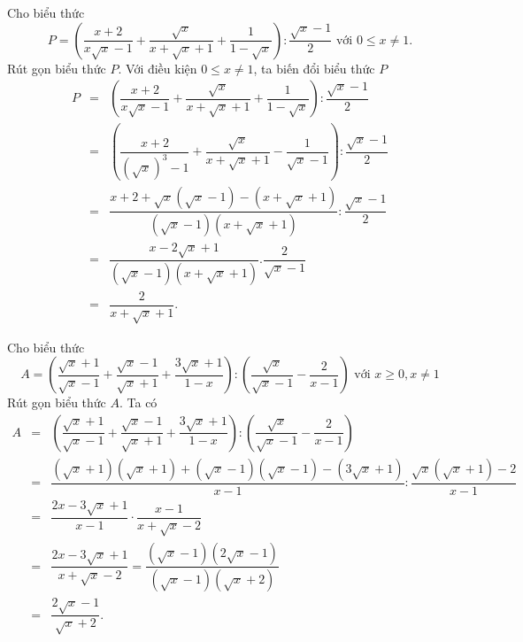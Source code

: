 \begin{bt}%
	Cho biểu thức $$P=\left({\dfrac{x+2}{x\sqrt{x}-1}+\dfrac{\sqrt{x}}{x+\sqrt{x}+1}+\dfrac{1}{1-\sqrt{x}}}\right):\dfrac{\sqrt{x}-1}{2} \text{ với } 0\leq x\ne 1.$$ Rút gọn biểu thức $P$.
	\loigiai
	{
		Với điều kiện $0\leq x\ne 1$, ta biến đổi biểu thức $P$
		\allowdisplaybreaks
		\begin{eqnarray*}
			P &=& \left({\dfrac{x+2}{x\sqrt{x}-1}+\dfrac{\sqrt{x}}{x+\sqrt{x}+1}+\dfrac{1}{1-\sqrt{x}}}\right):\dfrac{\sqrt{x}-1}{2}\\
			&=& \left({\dfrac{x+2}{\left(\sqrt{x}\right)^3-1}+\dfrac{\sqrt{x}}{x+\sqrt{x}+1}-\dfrac{1}{\sqrt{x}-1}}\right):\dfrac{\sqrt{x}-1}{2}\\
			&=& \dfrac{x+2+\sqrt{x}\left({\sqrt{x}-1}\right)-\left({x+\sqrt{x}+1}\right)}{\left({\sqrt{x}-1}\right)\left({x+\sqrt{x}+1}\right)}:\dfrac{\sqrt{x}-1}{2}\\
			&=& \dfrac{x-2\sqrt{x}+1}{\left({\sqrt{x}-1}\right)\left({x+\sqrt{x}+1}\right)}.\dfrac{2}{\sqrt{x}-1}\\
			&=& \dfrac{2}{x+\sqrt{x}+1}.
		\end{eqnarray*}
	}
\end{bt}

\begin{bt}%
	Cho biểu thức $$A=\left(\dfrac{\sqrt{x}+1}{\sqrt{x}-1}+\dfrac{\sqrt{x}-1}{\sqrt{x}+1}+\dfrac{3\sqrt{x}+1}{1-x}\right):\left(\dfrac{\sqrt{x}}{\sqrt{x}-1}-\dfrac{2}{x-1}\right) \text{ với } x\ge 0, x\ne 1$$ Rút gọn biểu thức $A$.
	\loigiai
	{
		Ta có
		\allowdisplaybreaks
		\begin{eqnarray*}
			A &=& \left(\dfrac{\sqrt{x}+1}{\sqrt{x}-1}+\dfrac{\sqrt{x}-1}{\sqrt{x}+1}+\dfrac{3\sqrt{x}+1}{1-x}\right):\left(\dfrac{\sqrt{x}}{\sqrt{x}-1}-\dfrac{2}{x-1}\right) \\ 
			&=& \dfrac{\left(\sqrt{x}+1\right)\left(\sqrt{x}+1\right)+\left(\sqrt{x}-1\right)\left(\sqrt{x}-1\right)-\left(3\sqrt{x}+1\right)}{x-1}:\dfrac{\sqrt{x}\left(\sqrt{x}+1\right)-2}{x-1} \\
			&=& \dfrac{2x-3\sqrt{x}+1}{x-1}\cdot \dfrac{x-1}{x+\sqrt{x}-2} \\
			&=& \dfrac{2x-3\sqrt{x}+1}{x+\sqrt{x}-2}=\dfrac{\left(\sqrt{x}-1\right)\left(2\sqrt{x}-1\right)}{\left(\sqrt{x}-1\right)\left(\sqrt{x}+2\right)} \\
			&=& \dfrac{2\sqrt{x}-1}{\sqrt{x}+2}.
		\end{eqnarray*}
	}
\end{bt}

